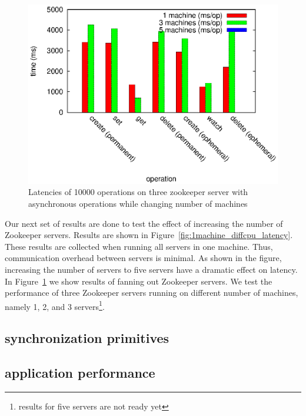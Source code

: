 \begin{figure}[h]
\centering
\includegraphics[scale=0.75]{img/1_machine_diff_machines.eps}
\caption{Latencies of 10000 operations on three zookeeper server with asynchronous operations while changing number of machines}
\label{fig:1machine_diffservers}
\end{figure}

Our next set of results are done to test the effect of increasing the number of Zookeeper servers. Results are shown in Figure~\ref{fig:1machine_diffcpu_latency}. These results are collected when running all servers in one machine. Thus, communication overhead between servers is minimal. As shown in the figure, increasing the number of servers to five servers have a dramatic effect on latency.
In Figure~\ref{fig:1machine_diffservers} we show results of fanning out Zookeeper servers. We test the performance of three Zookeeper servers running on different number of machines, namely 1, 2, and 3 servers\footnote{results for five servers are not ready yet}.

\subsection{synchronization primitives}

\subsection{application performance}

